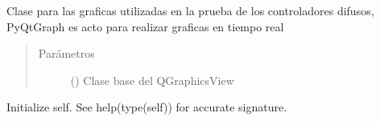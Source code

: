 \documentclass[letterpaper,10pt,spanish]{sphinxmanual}
\begin{document}
\begin{fulllineitems}
\label{\detokenize{codigos/Promociones:pyqtgraphWidget.PgraphWidget}}
Clase para las graficas utilizadas en la prueba de los controladores difusos, PyQtGraph es acto para realizar graficas en tiempo real
\begin{quote}\begin{description}
\item[{Parámetros}] \leavevmode
{} () \textendash{} Clase base del QGraphicsView

\end{description}\end{quote}

\begin{fulllineitems}
\label{\detokenize{codigos/Promociones:pyqtgraphWidget.PgraphWidget.__init__}}
Initialize self.  See help(type(self)) for accurate signature.

\end{fulllineitems}


\end{fulllineitems}

\end{document}
